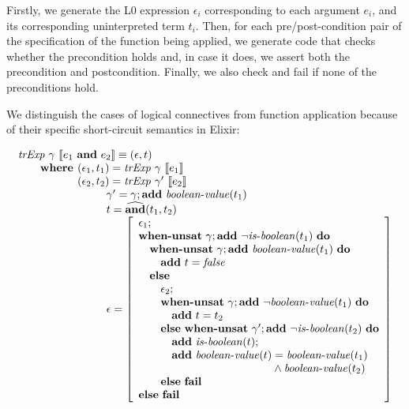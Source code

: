 Firstly, we generate the L0 expression $\epsilon_i$ corresponding to each 
argument $e_i$, and its corresponding uninterpreted term $t_i$. Then, for 
each pre/post-condition pair of the specification of the function being
applied, we generate code that checks whether the precondition holds and, 
in case it does, we assert both the precondition and postcondition. Finally,
we also check and fail if none of the preconditions hold.

We distinguish the cases of logical connectives from function application
because of their specific short-circuit semantics in Elixir:

\[
\begin{array}{l}
\trExp{\gamma}{\andE{e_1}{e_2}} \equiv (\epsilon, t)\\
\qquad \textbf{where }(\epsilon_1, t_1) = \trExp{\gamma}{e_1}\\
\qquad \phantom{\textbf{where }}(\epsilon_2, t_2) = \trExp{\gamma'}{e_2}\\
\qquad\qquad\qquad\qquad \gamma' = \gamma;\addE~\booleanvalue{t_1}\\
\qquad\qquad\qquad\qquad t = \widehat{\mathbf{and}}(t_1, t_2)\\
\qquad\qquad\qquad\qquad \epsilon = \left[ 
\begin{array}{l}
\epsilon_1;\\
\whenUnsatW~\gamma;\addE~\neg\isboolean{t_1}~\doW\\
\quad\whenUnsatW~\gamma;\addE~\booleanvalue{t_1}~\doW\\
\quad\quad\addE~t = \false\\
\quad\elseW\\
\quad\quad\epsilon_2;\\
\quad\quad\whenUnsatW~\gamma;\addE~\neg\booleanvalue{t_1}~\doW\\
\quad\quad\quad\addE~t = t_2\\
\quad\quad\elseW~\whenUnsatW~\gamma';\addE~\neg\isboolean{t_2}~\doW\\
\quad\quad\quad\addE~\isboolean{t};\\
\quad\quad\quad\addE~\booleanvalue{t} = \booleanvalue{t_1} \\
\quad\phantom{\quad\quad\addE~\booleanvalue{t}} \land \booleanvalue{t_2}\\
\quad\quad\elseW~\failE\\
\elseW~\failE
\end{array}
\right] \\
\end{array}
\]

